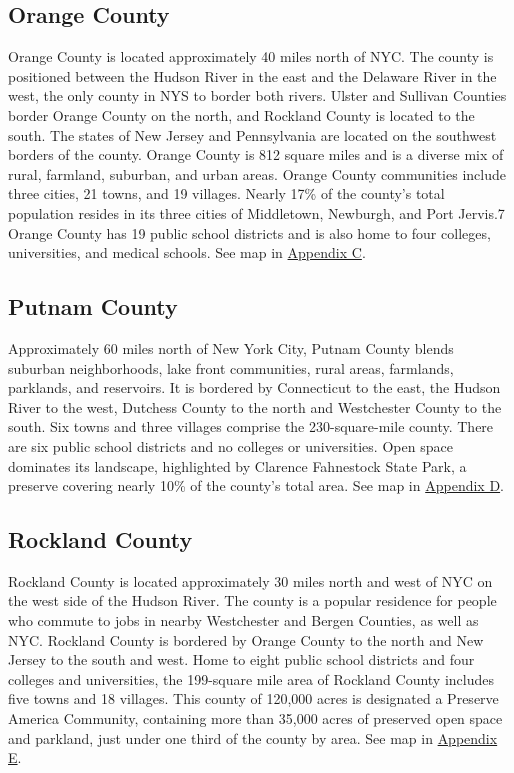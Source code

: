 \documentclass[
  english,
  letterpaper,
]{report}
\begin{document}
\subsection{Orange County}\label{orange-county-1}

Orange County is located approximately 40 miles north of NYC. The county
is positioned between the Hudson River in the east and the Delaware
River in the west, the only county in NYS to border both rivers. Ulster
and Sullivan Counties border Orange County on the north, and Rockland
County is located to the south. The states of New Jersey and
Pennsylvania are located on the southwest borders of the county. Orange
County is 812 square miles and is a diverse mix of rural, farmland,
suburban, and urban areas. Orange County communities include three
cities, 21 towns, and 19 villages. Nearly 17\% of the county's total
population resides in its three cities of Middletown, Newburgh, and Port
Jervis.7 Orange County has 19 public school districts and is also home
to four colleges, universities, and medical schools. See map in
\hyperref[sec-appendix-c-map]{Appendix C}.

\subsection{Putnam County}\label{putnam-county-1}

Approximately 60 miles north of New York City, Putnam County blends
suburban neighborhoods, lake front communities, rural areas, farmlands,
parklands, and reservoirs. It is bordered by Connecticut to the east,
the Hudson River to the west, Dutchess County to the north and
Westchester County to the south. Six towns and three villages comprise
the 230-square-mile county. There are six public school districts and no
colleges or universities. Open space dominates its landscape,
highlighted by Clarence Fahnestock State Park, a preserve covering
nearly 10\% of the county's total area. See map in
\hyperref[sec-appendix-d-map]{Appendix D}.

\subsection{Rockland County}\label{rockland-county-1}

Rockland County is located approximately 30 miles north and west of NYC
on the west side of the Hudson River. The county is a popular residence
for people who commute to jobs in nearby Westchester and Bergen
Counties, as well as NYC. Rockland County is bordered by Orange County
to the north and New Jersey to the south and west. Home to eight public
school districts and four colleges and universities, the 199-square mile
area of Rockland County includes five towns and 18 villages. This county
of 120,000 acres is designated a Preserve America Community, containing
more than 35,000 acres of preserved open space and parkland, just under
one third of the county by area. See map in
\hyperref[sec-appendix-e-map]{Appendix E}.
\end{document}
